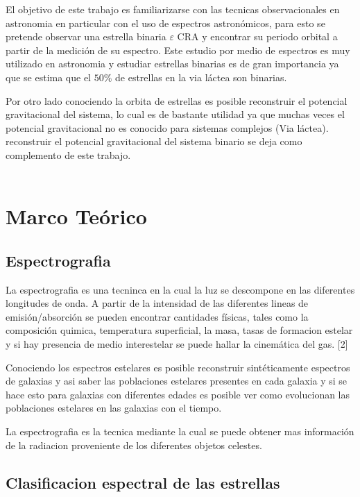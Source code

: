 \documentclass[Proceedings]{ascelike}
\begin{document}
El objetivo de este trabajo es familiarizarse con las tecnicas observacionales en astronomia en particular
con el uso de espectros astron\'omicos, para esto se pretende observar una estrella binaria $\varepsilon$ CRA 
y encontrar su periodo orbital a partir de la medici\'on de su espectro. Este estudio por medio de espectros es muy utilizado en astronomia y estudiar estrellas binarias es de gran importancia ya que se estima que el $50\%$ de estrellas en la via l\'actea son binarias.  

Por otro lado conociendo la orbita de estrellas es posible reconstruir el potencial gravitacional 
del sistema, lo cual es de bastante utilidad ya que muchas veces el potencial gravitacional no es conocido para sistemas complejos (Via l\'actea). reconstruir el potencial gravitacional del sistema binario se deja como 
complemento de este trabajo.\\
\\

\section{Marco Te\'orico}

\subsection{Espectrografia}

La espectrografia es una tecninca en la cual la luz se descompone en las diferentes
longitudes de onda. A partir de la intensidad de las diferentes lineas de emisi\'on/absorci\'on
se pueden encontrar cantidades f\'isicas, tales 
como la composici\'on quimica, temperatura superficial, la masa, tasas de formacion estelar
 y si hay presencia de medio interestelar se puede hallar la cinem\'atica del gas. [2]
 
Conociendo los espectros estelares es posible reconstruir sint\'eticamente espectros de galaxias
y asi saber las poblaciones estelares presentes en cada galaxia y si se hace esto para galaxias
con diferentes edades es posible ver como evolucionan las poblaciones estelares en las galaxias 
con el tiempo.

La espectrografia es la tecnica mediante la cual se puede obtener mas informaci\'on de la radiacion 
proveniente de los diferentes objetos celestes.

\subsection{Clasificacion espectral de las estrellas}
\end{document}
